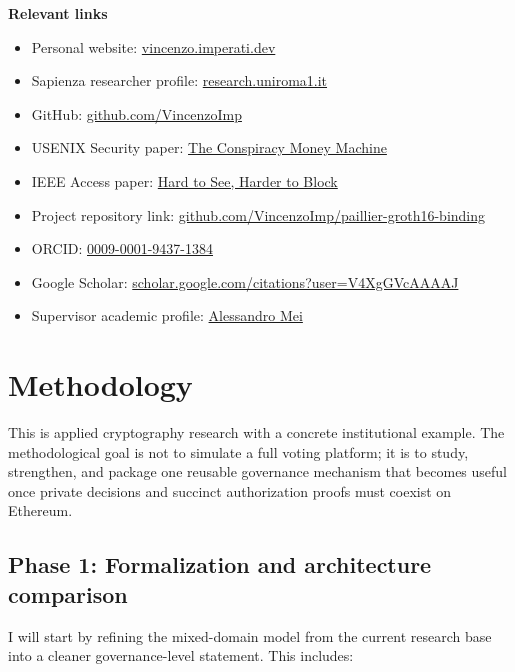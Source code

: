 \documentclass[11pt]{article}
\begin{document}
\textbf{Relevant links}
\begin{itemize}[leftmargin=*,nosep]
\item Personal website: \href{https://vincenzo.imperati.dev}{vincenzo.imperati.dev}
\item Sapienza researcher profile: \href{https://research.uniroma1.it/researcher/0f9c3c1227f530e4af686c68b186e30bf4f6679206966e380af17780}{research.uniroma1.it}
\item GitHub: \href{https://github.com/VincenzoImp}{github.com/VincenzoImp}
\item USENIX Security paper: \href{https://www.usenix.org/conference/usenixsecurity25/presentation/imperati}{The Conspiracy Money Machine}
\item IEEE Access paper: \href{https://ieeexplore.ieee.org/document/11224376}{Hard to See, Harder to Block}
\item Project repository link: \href{https://github.com/VincenzoImp/paillier-groth16-binding}{github.com/VincenzoImp/paillier-groth16-binding}
\item ORCID: \href{https://orcid.org/0009-0001-9437-1384}{0009-0001-9437-1384}
\item Google Scholar: \href{https://scholar.google.com/citations?user=V4XgGVcAAAAJ}{scholar.google.com/citations?user=V4XgGVcAAAAJ}
\item Supervisor academic profile: \href{http://wwwusers.di.uniroma1.it/~mei/}{Alessandro Mei}
\end{itemize}


\section{Methodology}

This is applied cryptography research with a concrete institutional example.
The methodological goal is not to simulate a full voting platform; it is to
study, strengthen, and package one reusable governance mechanism that becomes
useful once private decisions and succinct authorization proofs must coexist on
Ethereum.

\subsection{Phase 1: Formalization and architecture comparison}

I will start by refining the mixed-domain model from the current research base
into a cleaner governance-level statement. This includes:
\end{document}
